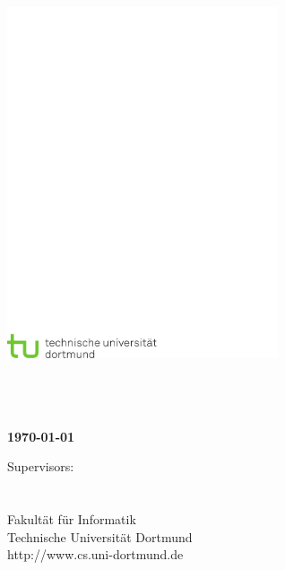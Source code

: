 \thispagestyle{empty}
\begin{titlepage}
\vspace*{-2cm}
\newlength{\links}
\setlength{\links}{-0.5cm} \sf \LARGE



\hspace*{\links}
\begin{minipage}{12.5cm}
\includegraphics[width=8cm]{coverpage/tud_logo_cmyk}
\end{minipage}

\vspace*{4cm}

\hspace*{\links}
\hspace*{-0.2cm}
\begin{minipage}{9cm}
\large
\begin{center}
\bf{\Titel} \\
\vspace*{1cm}
{\small \Untertitel} \\
\vspace*{1.5cm}
\Autor\\
\today
\end{center}
\end{minipage}



\vfill

\hspace*{\links}
\begin{minipage}[b]{15cm}
\normalsize
\raggedright
%
\vspace*{2.5cm}
%
\normalsize \raggedright
Supervisors: \\
\Supervisor \\
\otherSupervisor \\ 
\vspace*{1.5cm}
\textcolor{TUGreen}{Fakultät für Informatik\\
Technische Universität Dortmund \\
http://www.cs.uni-dortmund.de}
\end{minipage}


\end{titlepage}
